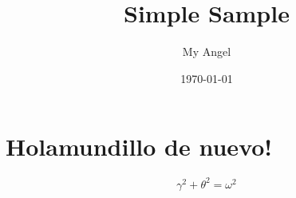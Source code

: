 \documentclass{article} %
\title{Simple Sample} %
\author{My Angel} %
\date{\today} %
\begin{document}
\maketitle %

\section{Holamundillo de nuevo!} %


\begin{equation} %
  \gamma^2+\theta^2=\omega^2
\end{equation}
\end{document}
